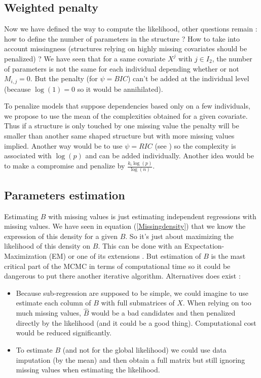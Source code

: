 \documentclass[11pt,a4paper]{report}
\begin{document}
					
			
		\subsection{Weighted penalty}
			Now we have defined the way to compute the likelihood, other questions remain : how to define the number of parameters in the structure ?		How to take into account missingness (structures relying on highly missing covariates should be penalized) ?
			We have seen that for a same covariate $X^j$ with $ j \in I_2$, the number of parameters is not the same for each individual depending whether or not $M_{i,j}=0$. But the penalty (for $\psi=BIC$) can't be added at the individual level (because $\log(1)=0$ so it would be annihilated). 
			
			To penalize models that suppose dependencies based only on a few individuals, we propose to use the mean of the complexities obtained for a given covariate. Thus if a structure is only touched by one missing value the penalty will be smaller than another same shaped structure but with more missing values implied.
			Another way would be to use $\psi=RIC$ (see \cite{foster1994risk}) so the complexity is associated with $\log(p)$ and can be added individually. Another idea would be to make a compromise and penalize by $\frac{k_i\log(p)}{\log(n)}$.
		
%	
		
		\subsection{Parameters estimation}
			Estimating $B$ with missing values is just estimating independent regressions with missing values. We have seen in equation (\ref{Missingdensity}) that we know the expression of this density for a given $B$. So it's just about maximizing the likelihood of this density on $B$. This can be done with an Expectation-Maximization (EM) \cite{dempster1977maximum} or one of its extensions \cite{mclachlan2007algorithm}.
			But estimation of $B$ is the mast critical part of the MCMC in terms of computational time so it could be dangerous to put there another iterative algorithm. 
			Alternatives does exist :
			\begin{itemize}
				\item Because sub-regression are supposed to be simple, we could imagine to use estimate each column of $B$ with full submatrices of $X$. When relying on too much missing values, $\hat{B}$ would be a bad candidates and then penalized directly by the likelihood (and it could be a good thing). Computational cost would be reduced significantly.
				\item To estimate $B$ (and not for the global likelihood) we could use data imputation (by the mean) and then obtain a full matrix but still ignoring missing values when estimating the likelihood.
			\end{itemize}
\end{document}
